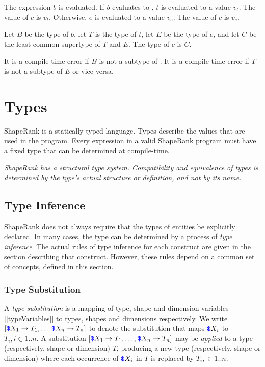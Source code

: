 \documentclass{article}
\begin{document}
{The expression $b$ is evaluated. 
If $b$ evaluates to \TRUE{}, $t$ is evaluated to a value $v_t$. The value of $c$ is $v_t$. Otherwise, $e$ is evaluated to a value $v_e$. The value of $c$ is $v_e$.

Let $B$ be the type of $b$, let $T$ is the type of $t$, let $E$ be the type of $e$, and let $C$ be the least common supertype of $T$ and $E$. The type of $c$ is $C$. 

It is a compile-time error if $B$ is not a subtype of \BOOL{}. It is a compile-time error if $T$ is not a subtype of $E$ or vice versa. 


\section{Types}
\label{types}

ShapeRank is a statically typed language. Types describe the values that are used in the program. Every expression in a valid ShapeRank program must have a fixed type that can be determined at compile-time.

{\em 
ShapeRank has a structural type system. Compatibility and equivalence of types is determined by the type's actual structure or definition, and not by  its name.
}

 \subsection{Type Inference}
  \label{typeInference}
  
 ShapeRank does not always require that the types of entities be explicitly declared.  In many cases, the type can be determined by a process of {\em type inference}. The actual rules of type inference for each construct are given in the section describing that construct. However, these rules depend on a common set of concepts, defined in this section.
 
  
  \subsubsection{Type Substitution}
  \label{typeSubstitution}
  
  A {\em type substitution} is a mapping of type, shape and dimension variables [\ref{typeVariables}] to types, shapes and dimensions respectively. We write $[\texttt{\color{blue} \$}{}X_1 \to T_1, \ldots\, \texttt{\color{blue} \$}{}X_n \to T_n]$ to denote the substitution that maps $\texttt{\color{blue} \$}{}X_i$ to $T_i, i \in 1..n$. A substitution $[\texttt{\color{blue} \$}{}X_1 \to T_1, \ldots, \texttt{\color{blue} \$}{}X_n \to T_n]$ may be {\em applied} to a type (respectively, shape or dimension) $T$, producing a new type (respectively, shape or dimension) where each occurrence of $\texttt{\color{blue} \$}{}X_i$ in $T$ is replaced by $T_i ,\in 1..n$.
  
}
\end{document}
